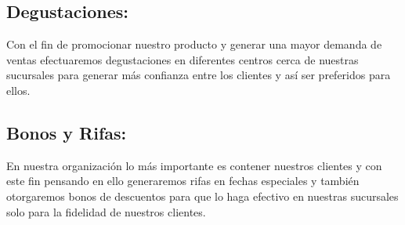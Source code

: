 \subsection{Degustaciones:} Con el fin de promocionar nuestro producto y generar una mayor demanda de ventas  efectuaremos degustaciones en diferentes centros cerca de nuestras sucursales para generar m\'as confianza entre los clientes y as\'i ser preferidos para ellos.
%
\subsection{Bonos y Rifas:} En nuestra  organizaci\'on lo m\'as importante es contener nuestros clientes y con este fin pensando en ello generaremos rifas en fechas especiales y tambi\'en otorgaremos bonos de descuentos para que lo haga efectivo en nuestras sucursales solo para la fidelidad de nuestros clientes.%